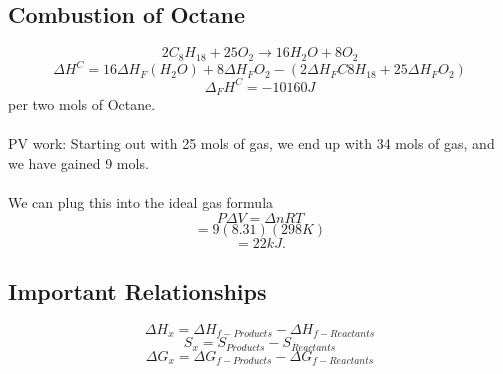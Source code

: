\documentclass[10pt, twocolumn]{report}
\begin{document}
     \subsection{Combustion of Octane}
     $$2C_8H_{18} + 25O_2 \rightarrow 16H_2O + 8 O_2$$
     $$\Delta H^C = 16 \Delta H_F (H_2O) + 8 \Delta H_F O_2 - (2\Delta H_F C8H_{18} + 25\Delta H_F O_2)$$
     $$\Delta_F H^C = -10160 J $$ per two mols of Octane.\\\\ PV work: Starting out with 25 mols of gas, we end up with 34 mols of gas, and we have gained 9 mols. \\\\ We can plug this into the ideal gas formula $$P\Delta V = \Delta n R T$$ $$ = 9 (8.31)(298K)$$ $$=22 kJ. $$
     \subsection{Important Relationships}
	$$\Delta H_x = \Delta H_{f-Products} - \Delta H_{f-Reactants}$$
	$$ S_x = S_{Products} - S_{Reactants}$$
	$$\Delta G_x = \Delta G_{f - Products} - \Delta G_{f - Reactants}$$
\end{document}
